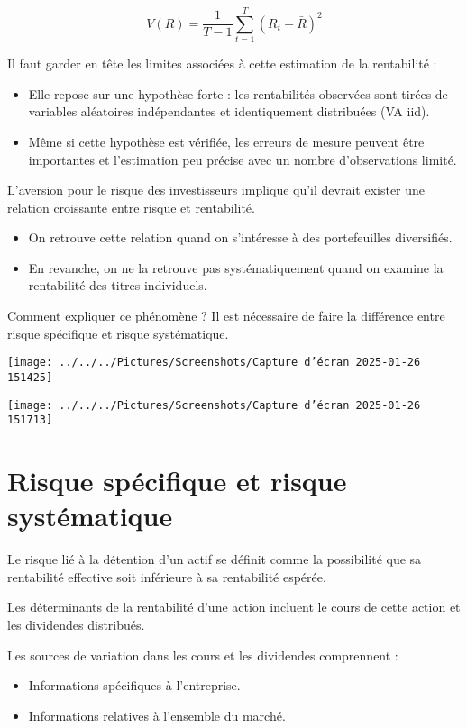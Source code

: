 \documentclass[a4paper, 12pt]{report}
\begin{document}
\[
V(R) = \frac{1}{T-1} \sum_{t=1}^{T} (R_t - \bar{R})^2 
\]

Il faut garder en tête les limites associées à cette estimation de la rentabilité :

\begin{itemize}
	\item Elle repose sur une hypothèse forte : les rentabilités observées sont tirées de variables aléatoires indépendantes et identiquement distribuées (VA iid).
	\item Même si cette hypothèse est vérifiée, les erreurs de mesure peuvent être importantes et l’estimation peu précise avec un nombre d'observations limité.
\end{itemize}

L'aversion pour le risque des investisseurs implique qu'il devrait exister une relation croissante entre risque et rentabilité. 

\begin{itemize}
	\item On retrouve cette relation quand on s'intéresse à des portefeuilles diversifiés.
	\item En revanche, on ne la retrouve pas systématiquement quand on examine la rentabilité des titres individuels.
\end{itemize}

Comment expliquer ce phénomène ? Il est nécessaire de faire la différence entre risque spécifique et risque systématique.

\begin{center}
	\texttt{[image: ../../../Pictures/Screenshots/Capture d'écran 2025-01-26 151425]}
	
	\texttt{[image: ../../../Pictures/Screenshots/Capture d'écran 2025-01-26 151713]}
\end{center}

\section{Risque spécifique et risque systématique}

Le risque lié à la détention d'un actif se définit comme la possibilité que sa rentabilité effective soit inférieure à sa rentabilité espérée.

Les déterminants de la rentabilité d'une action incluent le cours de cette action et les dividendes distribués.

Les sources de variation dans les cours et les dividendes comprennent :
\begin{itemize}
	\item Informations spécifiques à l'entreprise.
	\item Informations relatives à l'ensemble du marché.
\end{itemize}
\end{document}
